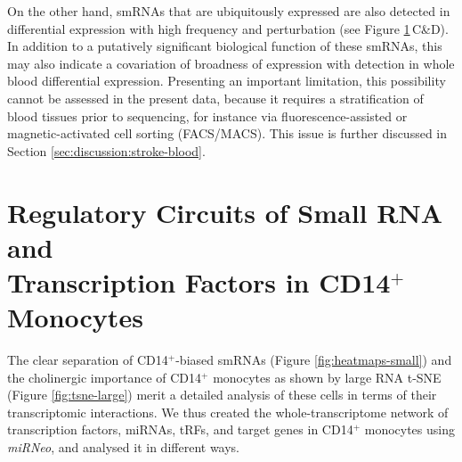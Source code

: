 \begin{figure}
{\label{fig:tsne-small}}
\end{figure}

On the other hand, smRNAs that are ubiquitously expressed are also detected in differential expression with high frequency and perturbation (see Figure \ref{fig:tsne-small}\,C\&D). In addition to a putatively significant biological function of these smRNAs, this may also indicate a covariation of broadness of expression with detection in whole blood differential expression. Presenting an important limitation, this possibility cannot be assessed in the present data, because it requires a stratification of blood tissues prior to sequencing, for instance via fluorescence-assisted or magnetic-activated cell sorting (FACS/MACS). This issue is further discussed in Section \ref{sec:discussion:stroke-blood}.


\section[Regulatory Circuits of Small RNA and Transcription Factors in CD14$^+$ Monocytes]{Regulatory Circuits of Small RNA and \\Transcription Factors in CD14$^+$ Monocytes} \label{sec:stroke:circuits}
The clear separation of CD14$^+$-biased smRNAs (Figure \ref{fig:heatmaps-small}) and the cholinergic importance of CD14$^+$ monocytes as shown by large RNA t-SNE (Figure \ref{fig:tsne-large}) merit a detailed analysis of these cells in terms of their transcriptomic interactions. We thus created the whole-transcriptome network of transcription factors, miRNAs, tRFs, and target genes in CD14$^+$ monocytes using \emph{miRNeo}, and analysed it in different ways.

